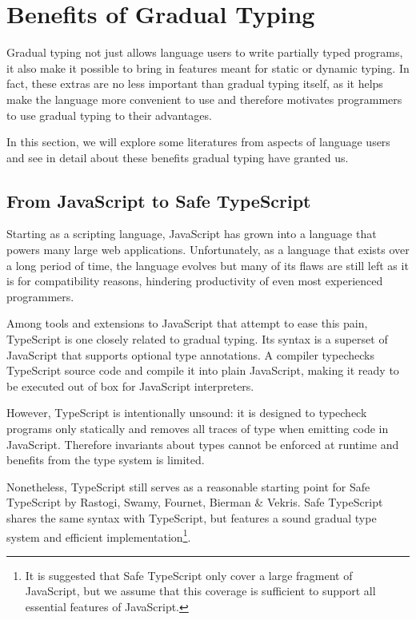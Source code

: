 
\section{Benefits of Gradual Typing}

Gradual typing not just allows language users to write partially typed programs,
it also make it possible to bring in features meant for static or dynamic typing.
In fact, these extras are no less important than gradual typing itself,
as it helps make the language more convenient to use
and therefore motivates programmers to use gradual typing to their advantages.

In this section, we will explore some literatures
from aspects of language users and see in detail about these benefits
gradual typing have granted us.

\subsection{From JavaScript to Safe TypeScript}

Starting as a scripting language,
JavaScript has grown into a language that powers many large web applications.
Unfortunately, as a language that exists over a long period of time,
the language evolves but many of its flaws are still left as it is for compatibility reasons,
hindering productivity of even most experienced programmers.

Among tools and extensions to JavaScript that attempt to ease this pain,
TypeScript is one closely related to gradual typing.
Its syntax is a superset of JavaScript that supports optional type annotations\cite{bierman2014understanding}.
A compiler typechecks TypeScript source code
and compile it into plain JavaScript,
making it ready to be executed out of box for JavaScript interpreters.

However, TypeScript is intentionally unsound:
it is designed to typecheck programs only statically
and removes all traces of type when emitting code in JavaScript.
Therefore invariants about types cannot be enforced at runtime
 and benefits from the type system is limited.

Nonetheless, TypeScript still serves as a reasonable starting point
for Safe TypeScript by Rastogi, Swamy, Fournet, Bierman \& Vekris\cite{rastogi2015safe}.
Safe TypeScript shares the same syntax with TypeScript,
but features a sound gradual type system and efficient implementation\footnote{It is suggested
that Safe TypeScript only cover a large fragment of JavaScript, but we assume that this coverage
is sufficient to support all essential features of JavaScript.
}.

